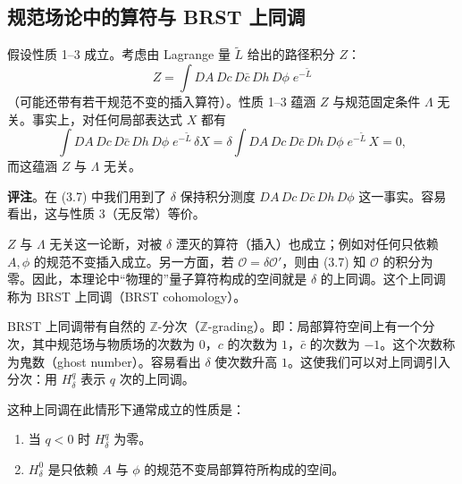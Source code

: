 \subsection{规范场论中的算符与 BRST 上同调}

假设性质 1–3 成立。考虑由 Lagrange 量 $\widetilde{L}$ 给出的路径积分 $Z$：
\begin{equation}
  \tag{3.6}
  \label{eq:3-6}
  Z=\int DA\,Dc\,D\bar c\,Dh\,D\phi\;e^{-\widetilde{L}}
\end{equation}
（可能还带有若干规范不变的插入算符）。性质 1–3 蕴涵 $Z$ 与规范固定条件 $\Lambda$ 无关。事实上，对任何局部表达式 $X$ 都有
\begin{equation}
  \tag{3.7}
  \label{eq:3-7}
  \int DA\,Dc\,D\bar c\,Dh\,D\phi\;e^{-\widetilde{L}}\,\delta X
  =\delta\int DA\,Dc\,D\bar c\,Dh\,D\phi\;e^{-\widetilde{L}}\,X=0,
\end{equation}
而这蕴涵 $Z$ 与 $\Lambda$ 无关。

\textbf{评注}。在 (3.7) 中我们用到了 $\delta$ 保持积分测度 $DA\,Dc\,D\bar c\,Dh\,D\phi$ 这一事实。容易看出，这与性质 3（无反常）等价。


$Z$ 与 $\Lambda$ 无关这一论断，对被 $\delta$ 湮灭的算符（插入）也成立；例如对任何只依赖 $A,\phi$ 的规范不变插入成立。另一方面，若 $\mathcal{O}=\delta\mathcal{O}'$，则由 (3.7) 知 $\mathcal{O}$ 的积分为零。因此，本理论中“物理的”量子算符构成的空间就是 $\delta$ 的上同调。这个上同调称为 BRST 上同调（BRST cohomology）。

BRST 上同调带有自然的 $\mathbb{Z}$-分次（$\mathbb{Z}$-grading）。即：局部算符空间上有一个分次，其中规范场与物质场的次数为 $0$，$c$ 的次数为 $1$，$\bar c$ 的次数为 $-1$。这个次数称为鬼数（ghost number）。容易看出 $\delta$ 使次数升高 $1$。这使我们可以对上同调引入分次：用 $H^q_\delta$ 表示 $q$ 次的上同调。

这种上同调在此情形下通常成立的性质是：

\begin{enumerate}
  \item 当 $q<0$ 时 $H^q_\delta$ 为零。
  \item $H^0_\delta$ 是只依赖 $A$ 与 $\phi$ 的规范不变局部算符所构成的空间。
\end{enumerate}

